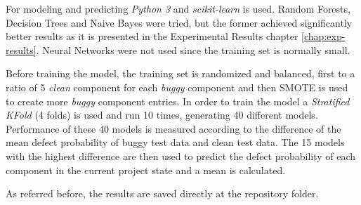 For modeling and predicting \emph{Python 3} and \emph{scikit-learn} is used.
Random Forests, Decision Trees and Naive Bayes were tried, but the former achieved significantly better results as it is presented in the Experimental Results chapter \ref{chap:exp-results}.
Neural Networks were not used since the training set is normally small.

Before training the model, the training set is randomized and balanced, first to a ratio of 5 \emph{clean} component for each \emph{buggy} component 
and then SMOTE is used to create more \emph{buggy} component entries. In order to train the model a \emph{Stratified KFold} (4 folds) is used and run 10 times, 
generating 40 different models. Performance of these 40 models is measured according to the difference of the mean defect probability of buggy test data and clean test data. 
The 15 models with the highest difference are then used to predict the defect probability of each component in the current project state and a mean is calculated.

As referred before, the results are saved directly at the repository folder.
